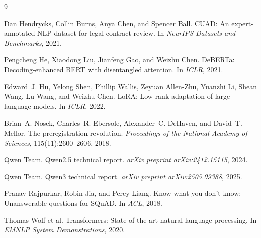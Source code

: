 \documentclass[11pt,letterpaper]{article}
\begin{document}
\begin{thebibliography}{9}

Dan Hendrycks, Collin Burns, Anya Chen, and Spencer Ball.
\newblock CUAD: An expert-annotated NLP dataset for legal contract review.
\newblock In \emph{NeurIPS Datasets and Benchmarks}, 2021.

Pengcheng He, Xiaodong Liu, Jianfeng Gao, and Weizhu Chen.
\newblock DeBERTa: Decoding-enhanced BERT with disentangled attention.
\newblock In \emph{ICLR}, 2021.

Edward~J. Hu, Yelong Shen, Phillip Wallis, Zeyuan Allen-Zhu, Yuanzhi Li,
Shean Wang, Lu Wang, and Weizhu Chen.
\newblock LoRA: Low-rank adaptation of large language models.
\newblock In \emph{ICLR}, 2022.

Brian~A. Nosek, Charles~R. Ebersole, Alexander~C. DeHaven, and David~T.
Mellor.
\newblock The preregistration revolution.
\newblock \emph{Proceedings of the National Academy of Sciences},
115(11):2600--2606, 2018.

Qwen Team.
\newblock Qwen2.5 technical report.
\newblock \emph{arXiv preprint arXiv:2412.15115}, 2024.

Qwen Team.
\newblock Qwen3 technical report.
\newblock \emph{arXiv preprint arXiv:2505.09388}, 2025.

Pranav Rajpurkar, Robin Jia, and Percy Liang.
\newblock Know what you don't know: Unanswerable questions for SQuAD.
\newblock In \emph{ACL}, 2018.

Thomas Wolf et al.
\newblock Transformers: State-of-the-art natural language processing.
\newblock In \emph{EMNLP System Demonstrations}, 2020.

\end{thebibliography}
\end{document}
